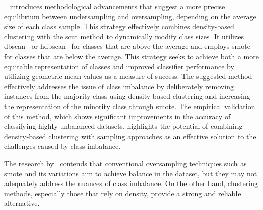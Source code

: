 ~\citet{densitybased_IM_munguia2023density} introduces methodological advancements that suggest a more precise equilibrium between undersampling and oversampling, depending on the average size of each class sample. This strategy effectively combines density-based clustering with the \gls{scut} method to dynamically modify class sizes. It utilizes \gls{dbscan}~\citep{DBSCAN_algo_ester1996density} or \gls{hdbscan}~\citep{HDBSCAN_algo_campello2013density} for classes that are above the average and employs \gls{smote}~\citep{H_13_chawla2002smote} for classes that are below the average. This strategy seeks to achieve both a more equitable representation of classes and improved classifier performance by utilizing geometric mean values as a measure of success. The suggested method effectively addresses the issue of class imbalance by deliberately removing instances from the majority class using density-based clustering and increasing the representation of the minority class through \gls{smote}. The empirical validation of this method, which shows significant improvements in the accuracy of classifying highly unbalanced datasets, highlights the potential of combining density-based clustering with sampling approaches as an effective solution to the challenges caused by class imbalance.

The research by~\citet{densitybased_IM_munguia2023density} contends that conventional oversampling techniques such as \gls{smote} and its variations aim to achieve balance in the dataset, but they may not adequately address the nuances of class imbalance. On the other hand, clustering methods, especially those that rely on density, provide a strong and reliable alternative.

